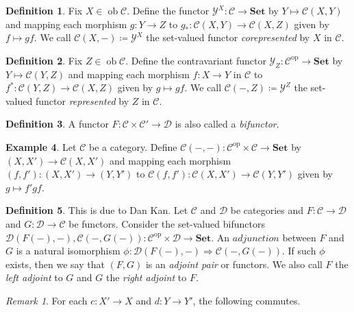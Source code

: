 \documentclass[10pt,letterpaper,cm]{nupset}
\theoremstyle{definition}
\newtheorem{definition}{Definition}
\newtheorem{exmp}[definition]{Example}
\theoremstyle{theorem}
\theoremstyle{remark}
\newtheorem{remark}{Remark}
\newcommand{\1}{\mathbf{1}}
\renewcommand{\c}{\mathscr{C}}
\renewcommand{\d}{\mathscr{D}}
\newcommand{\y}{\mathscr{Y}}
\newcommand{\0}{\vec 0}
\DeclareMathOperator{\op}{op}
\DeclareMathOperator{\ob}{ob}
\begin{document}
\begin{definition}
Fix $X \in \ob \c$. Define the functor $\y^X : \c \to \mathbf{Set}$ by $Y \mapsto \c(X, Y)$  and mapping each morphism $g: Y \to Z$ to $g_{\ast} : \c(X, Y) \to \c(X, Z)$ given by $f \mapsto gf$. We call $\c(X, -)\coloneqq\y^X$ the set-valued functor \textit{corepresented} by $X$ in $\c$.
\end{definition}

\begin{definition}
Fix $Z \in \ob \c$. Define the contravariant functor $\y_Z: \c^{\op} \to \mathbf{Set}$ by $Y \mapsto \c(Y, Z)$ and mapping each morphism $f: X \to Y$ in $\c$ to $f^{\ast} : \c(Y, Z) \to \c(X, Z)$ given by $g\mapsto gf$. We call $\c(-, Z)\coloneqq \y^Z$ the set-valued functor \textit{represented} by $Z$ in $\c$.
\end{definition}

\begin{definition}
A functor $F: \c \times \c' \to \d$ is also called a \textit{bifunctor}.
\end{definition}

\begin{exmp}
Let $\c$ be a category. Define $\c(-, -): \c^{\op} \times \c \to \mathbf{Set}$ by $(X, X') \to \c(X, X')$ and mapping each morphism $(f, f') : (X, X') \to (Y, Y')$ to $\c(f, f') : \c(X, X') \to \c(Y, Y')$ given by $g \mapsto f'gf$.
\end{exmp}

\begin{definition}
This is due to Dan Kan. Let $\c$ and $\d$ be categories and $F : \c \to \d$ and $G: \d \to \c$ be functors. Consider the set-valued bifunctors $ \d(F(-), -), \c(-, G(-)): \c^{\op} \times \d \to \mathbf{Set}$. An $\textit{adjunction}$ between $F$ and $G$ is a natural isomorphism $\phi : \d(F(-), -) \Rightarrow \c(-, G(-))$. If such $\phi$ exists, then we say that $(F, G)$ is an \textit{adjoint pair} or functors. We also call $F$ the \textit{left adjoint} to $G$ and $G$ the \textit{right adjoint} to $F$. 

\begin{remark}
For each $c: X' \to X$ and $d: Y \to Y'$, the following commutes.

\begin{center}
\end{center}

\end{remark}

\end{definition}
\end{document}

